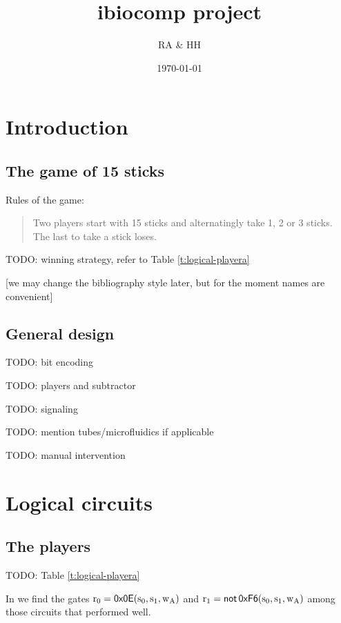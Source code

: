 \documentclass[12pt,notitlepage]{article}
\title{ibiocomp project}
\author{RA \& HH}
\date{\today}
\newcommand{\TODO}[1]{\textrm{\color{red}TODO: #1}}
\newcommand{\NOT}{\ensuremath{\mathop{\mathsf{not}}}\xspace}
\newcommand{\ra}[1]{{\color{Blue}#1}}
\begin{document}
\maketitle




\section{Introduction}

\subsection{The game of 15 sticks}

Rules of the game: %
%
\begin{quote}
	Two players start with 15 sticks
	and alternatingly 
	take 1, 2 or 3 sticks.
	\\
	The last to take a stick loses.
\end{quote}

\TODO{winning strategy, refer to Table \ref{t:logical-playera}}

\ra{[we may change the bibliography style later, but for the moment names are convenient]}

\subsection{General design}

\TODO{bit encoding}

\TODO{players and subtractor}

\TODO{signaling}

\TODO{mention tubes/microfluidics if applicable}

\TODO{manual intervention}


\section{Logical circuits}

\subsection{The players}

\TODO{Table \ref{t:logical-playera}}

In
\cite{NielsenETAL2016}
we find the gates
$
	\ce{r_0} = 
	\mathop{\mathsf{0x0E}}
	(\ce{s_0}, \ce{s_1}, \ce{w_A})
$
and
$
	\ce{r_1} =
	\NOT
	\mathop{\mathsf{0xF6}}
	(\ce{s_0}, \ce{s_1}, \ce{w_A})
$
among those circuits that performed well.
%
\end{document}
